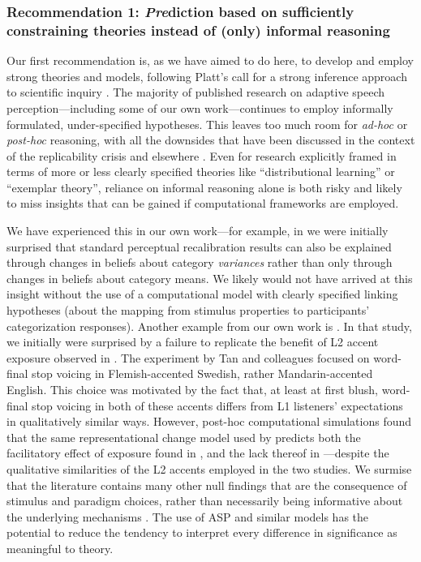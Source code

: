 \documentclass[
  11pt,
  man,floatsintext]{apa6}
\begin{document}
\subsubsection{\texorpdfstring{Recommendation 1: \emph{Pre}diction based on sufficiently constraining theories instead of (only) informal reasoning}{Recommendation 1: Prediction based on sufficiently constraining theories instead of (only) informal reasoning}}\label{recommendation-1-prediction-based-on-sufficiently-constraining-theories-instead-of-only-informal-reasoning}

Our first recommendation is, as we have aimed to do here, to develop and employ strong theories and models, following Platt's call for a strong inference approach to scientific inquiry \autocite{platt1964}. The majority of published research on adaptive speech perception---including some of our own work---continues to employ informally formulated, under-specified hypotheses. This leaves too much room for \emph{ad-hoc} or \emph{post-hoc} reasoning, with all the downsides that have been discussed in the context of the replicability crisis and elsewhere \autocites[e.g.,][]{guest-martin2021,starns2019,vasishth2021,yarkoni2022}. Even for research explicitly framed in terms of more or less clearly specified theories like ``distributional learning'' or ``exemplar theory'', reliance on informal reasoning alone is both risky and likely to miss insights that can be gained if computational frameworks are employed.

We have experienced this in our own work---for example, in \textcite{kleinschmidt-jaeger2015} we were initially surprised that standard perceptual recalibration results can also be explained through changes in beliefs about category \emph{variances} rather than only through changes in beliefs about category means. We likely would not have arrived at this insight without the use of a computational model with clearly specified linking hypotheses (about the mapping from stimulus properties to participants' categorization responses). Another example from our own work is \textcite{tan2021}. In that study, we initially were surprised by a failure to replicate the benefit of L2 accent exposure observed in \textcite{xie2016jep}. The experiment by Tan and colleagues focused on word-final stop voicing in Flemish-accented Swedish, rather Mandarin-accented English. This choice was motivated by the fact that, at least at first blush, word-final stop voicing in both of these accents differs from L1 listeners' expectations in qualitatively similar ways. However, post-hoc computational simulations found that the same representational change model used by \textcite{kleinschmidt-jaeger2015} predicts both the facilitatory effect of exposure found in \textcite{xie2016jep}, and the lack thereof in \textcite{tan2021} ---despite the qualitative similarities of the L2 accents employed in the two studies. We surmise that the literature contains many other null findings that are the consequence of stimulus and paradigm choices, rather than necessarily being informative about the underlying mechanisms \autocites[see e.g.,][]{floccia2006,zheng-samuel2020}. The use of ASP and similar models has the potential to reduce the tendency to interpret every difference in significance as meaningful to theory.
\end{document}
